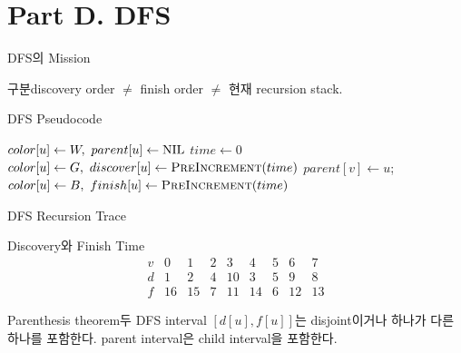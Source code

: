 \section{Part D. DFS}
\begin{frame}{DFS의 Mission}
\begin{block}{구분}discovery order \(\ne\) finish order \(\ne\) 현재 recursion stack.\end{block}
\end{frame}
\begin{frame}{DFS Pseudocode}
\algofont
\begin{algorithmic}[1]
\State $color[u]\gets W,\ parent[u]\gets\NIL$\EndFor
\State $time\gets0$
\State {}\EndIf\EndFor\EndProcedure
{}\State $color[u]\gets G,\ discover[u]\gets\Call{PreIncrement}{time}$
\State $parent[v]\gets u$; \EndIf\EndFor
\State $color[u]\gets B,\ finish[u]\gets\Call{PreIncrement}{time}$\EndProcedure
\end{algorithmic}
\end{frame}
\begin{frame}{DFS Recursion Trace}
\centering{}
\end{frame}
\begin{frame}{Discovery와 Finish Time}
\[
\begin{array}{c|cccccccc}v&0&1&2&3&4&5&6&7\\\hline
d&1&2&4&10&3&5&9&8\\f&16&15&7&11&14&6&12&13
\end{array}
\]
\begin{block}{Parenthesis theorem}두 DFS interval \([d[u],f[u]]\)는 disjoint이거나 하나가 다른 하나를 포함한다. parent interval은 child interval을 포함한다.\end{block}
\end{frame}
